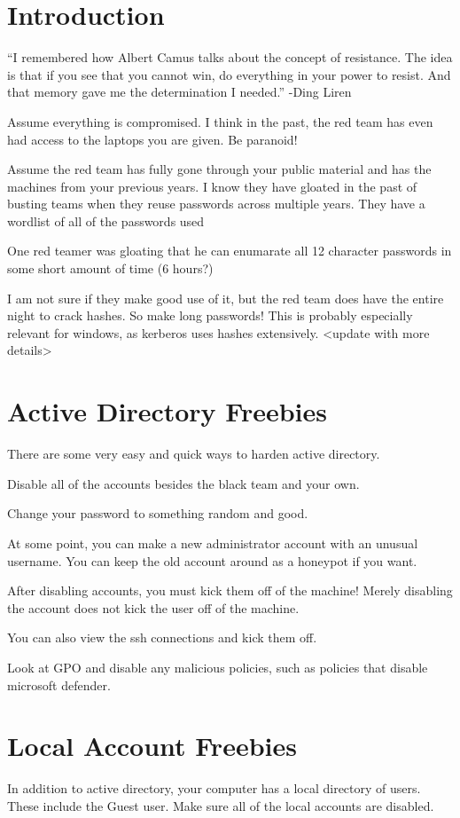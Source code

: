\documentclass{article}
\begin{document}
\graphicspath{ {./Images/} }
\tableofcontents

\section{Introduction}
“I remembered how Albert Camus talks about the concept of resistance. 
The idea is that if you see that you cannot win, do everything in your power to resist. And that memory gave me the determination I needed.”
-Ding Liren

Assume everything is compromised. I think in the past, the red team has even had access to the laptops you are given. Be paranoid!

Assume the red team has fully gone through your public material and has the machines from your previous years.
I know they have gloated in the past of busting teams when they reuse passwords across multiple years.
They have a wordlist of all of the passwords used 

One red teamer was gloating that he can enumarate all 12 character passwords in some short amount of time (6 hours?)

I am not sure if they make good use of it, but the red team does have the entire night to crack hashes. So make long passwords!
This is probably especially relevant for windows, as kerberos uses hashes extensively. <update with more details>

\section{Active Directory Freebies}
There are some very easy and quick ways to harden active directory. 

Disable all of the accounts besides the black team and your own.

Change your password to something random and good. 

At some point, you can make a new administrator account with an unusual username. You can keep the old account around as a honeypot if you want.

After disabling accounts, you must kick them off of the machine! Merely disabling the account does not kick the user off of the machine.

You can also view the ssh connections and kick them off.

Look at GPO and disable any malicious policies, such as policies that disable microsoft defender.


\section{Local Account Freebies}
In addition to active directory, your computer has a local directory of users. These include the Guest user.
Make sure all of the local accounts are disabled. 
\end{document}
